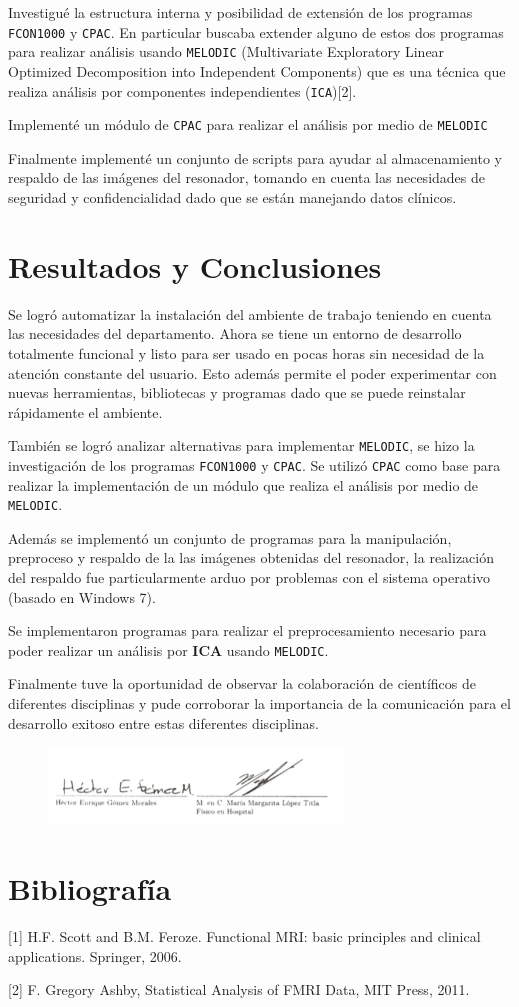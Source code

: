 \documentclass{article}
\begin{document}
Investigué la estructura interna y posibilidad de extensión de los programas \texttt{FCON1000} y \texttt{CPAC}. En particular buscaba extender alguno de estos dos programas para realizar análisis usando \texttt{MELODIC} (Multivariate Exploratory Linear Optimized Decomposition into Independent Components) que es una técnica que realiza análisis por componentes independientes (\texttt{ICA})[2].

Implementé un módulo de \texttt{CPAC} para realizar el análisis por medio de \texttt{MELODIC}

Finalmente implementé un conjunto de scripts para ayudar al almacenamiento y respaldo de las imágenes del resonador, tomando en cuenta las necesidades de seguridad y confidencialidad dado que se están manejando datos clínicos.

\section{Resultados y Conclusiones}

Se logró automatizar la instalación del ambiente de trabajo teniendo en cuenta las necesidades del departamento. Ahora se tiene un entorno de desarrollo totalmente funcional y listo para ser usado en pocas horas sin necesidad de la atención constante del usuario. Esto además permite el poder experimentar con nuevas herramientas, bibliotecas y programas dado que se puede reinstalar rápidamente el ambiente.

También se logró analizar alternativas para implementar \texttt{MELODIC}, se hizo la investigación de los programas \texttt{FCON1000} y \texttt{CPAC}. Se utilizó \texttt{CPAC} como base para realizar la implementación de un módulo 
que realiza el análisis por medio de \texttt{MELODIC}.

Además se implementó un conjunto de programas  para la manipulación, preproceso y respaldo de la las imágenes obtenidas del resonador, la realización del respaldo fue particularmente arduo por problemas con el sistema operativo (basado en Windows 7).

Se implementaron programas para realizar el preprocesamiento necesario para poder realizar un análisis por \textbf{ICA} usando \texttt{MELODIC}.

Finalmente tuve la oportunidad de observar la colaboración de científicos de diferentes disciplinas y pude corroborar la importancia de la comunicación para el desarrollo exitoso entre estas diferentes disciplinas.

\begin{figure}[h!]
	\centering\includegraphics[width=0.7\textwidth]{signatures.png}
\end{figure}\vskip10pt

\section{Bibliografía}

[1] H.F. Scott and B.M. Feroze. Functional MRI: basic principles and clinical applications. Springer, 2006.

[2] F. Gregory Ashby, Statistical Analysis of FMRI Data, MIT Press, 2011.
\end{document}
